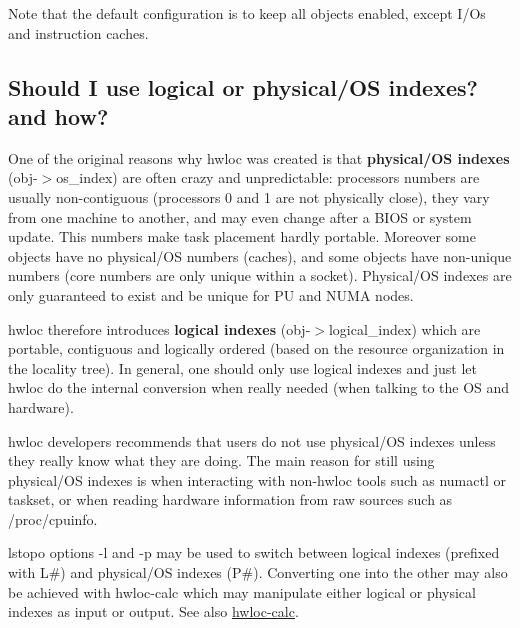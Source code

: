 Note that the default configuration is to keep all objects enabled, except I/\+Os and instruction caches.\hypertarget{a00394_faq_indexes}{}\subsection{Should I use logical or physical/\+O\+S indexes? and how?}\label{a00394_faq_indexes}
One of the original reasons why hwloc was created is that {\bfseries physical/\+OS indexes} ({\ttfamily obj-\/$>$os\+\_\+index}) are often crazy and unpredictable\+: processors numbers are usually non-\/contiguous (processors 0 and 1 are not physically close), they vary from one machine to another, and may even change after a B\+I\+OS or system update. This numbers make task placement hardly portable. Moreover some objects have no physical/\+OS numbers (caches), and some objects have non-\/unique numbers (core numbers are only unique within a socket). Physical/\+OS indexes are only guaranteed to exist and be unique for PU and N\+U\+MA nodes.

hwloc therefore introduces {\bfseries logical indexes} ({\ttfamily obj-\/$>$logical\+\_\+index}) which are portable, contiguous and logically ordered (based on the resource organization in the locality tree). In general, one should only use logical indexes and just let hwloc do the internal conversion when really needed (when talking to the OS and hardware).

hwloc developers recommends that users do not use physical/\+OS indexes unless they really know what they are doing. The main reason for still using physical/\+OS indexes is when interacting with non-\/hwloc tools such as numactl or taskset, or when reading hardware information from raw sources such as /proc/cpuinfo.

lstopo options {\ttfamily -\/l} and {\ttfamily -\/p} may be used to switch between logical indexes (prefixed with {\ttfamily L\#}) and physical/\+OS indexes ({\ttfamily P\#}). Converting one into the other may also be achieved with hwloc-\/calc which may manipulate either logical or physical indexes as input or output. See also \hyperlink{a00381_cli_hwloc_calc}{hwloc-\/calc}.

